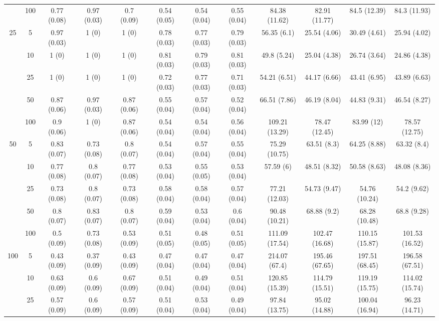 \documentclass[10pt]{article}
\theoremstyle{definition}
\begin{document}
\begin{table}[H]
\begin{center}
{\begin{tabular}{cc|ccc|ccc|cccc|}
  & 100  & 0.77 (0.08) & 0.97 (0.03) & 0.7 (0.09) & 0.54 (0.05) & 0.54 (0.04) & 0.55 (0.04) & 84.38 (11.62) & 82.91 (11.77) & 84.5 (12.39) & 84.3 (11.93) \\[.3cm] 
  \multirow{5}{*}{25} & 5  & 0.97 (0.03) & 1 (0) & 1 (0) & 0.78 (0.03) & 0.77 (0.03) & 0.79 (0.03) & 56.35 (6.1) & 25.54 (4.06) & 30.49 (4.61) & 25.94 (4.02) \\ 
   & 10  & 1 (0) & 1 (0) & 1 (0) & 0.81 (0.03) & 0.79 (0.03) & 0.81 (0.03) & 49.8 (5.24) & 25.04 (4.38) & 26.74 (3.64) & 24.86 (4.38) \\ 
  & 25  & 1 (0) & 1 (0) & 1 (0) & 0.72 (0.03) & 0.77 (0.03) & 0.71 (0.03) & 54.21 (6.51) & 44.17 (6.66) & 43.41 (6.95) & 43.89 (6.63) \\ 
  & 50  & 0.87 (0.06) & 0.97 (0.03) & 0.87 (0.06) & 0.55 (0.04) & 0.57 (0.04) & 0.52 (0.04) & 66.51 (7.86) & 46.19 (8.04) & 44.83 (9.31) & 46.54 (8.27) \\ 
  & 100  & 0.9 (0.06) & 1 (0) & 0.87 (0.06) & 0.54 (0.04) & 0.54 (0.04) & 0.56 (0.04) & 109.21 (13.29) & 78.47 (12.45) & 83.99 (12) & 78.57 (12.75)\\[.3cm] 
  \multirow{5}{*}{50} & 5  & 0.83 (0.07) & 0.73 (0.08) & 0.8 (0.07) & 0.54 (0.04) & 0.57 (0.04) & 0.55 (0.04) & 75.29 (10.75) & 63.51 (8.3) & 64.25 (8.88) & 63.32 (8.4) \\ 
  & 10  & 0.77 (0.08) & 0.8 (0.07) & 0.77 (0.08) & 0.53 (0.04) & 0.55 (0.05) & 0.53 (0.04) & 57.59 (6) & 48.51 (8.32) & 50.58 (8.63) & 48.08 (8.36) \\ 
  & 25  & 0.73 (0.08) & 0.8 (0.07) & 0.73 (0.08) & 0.58 (0.04) & 0.58 (0.04) & 0.57 (0.04) & 77.21 (12.03) & 54.73 (9.47) & 54.76 (10.24) & 54.2 (9.62) \\ 
  & 50  & 0.8 (0.07) & 0.83 (0.07) & 0.8 (0.07) & 0.59 (0.04) & 0.53 (0.04) & 0.6 (0.04) & 90.48 (10.21) & 68.88 (9.2) & 68.28 (10.48) & 68.8 (9.28) \\ 
  & 100  & 0.5 (0.09) & 0.73 (0.08) & 0.53 (0.09) & 0.51 (0.05) & 0.48 (0.05) & 0.51 (0.05) & 111.09 (17.54) & 102.47 (16.68) & 110.15 (15.87) & 101.53 (16.52) \\[.3cm] 
  \multirow{5}{*}{100} & 5  & 0.43 (0.09) & 0.37 (0.09) & 0.43 (0.09) & 0.47 (0.04) & 0.47 (0.04) & 0.47 (0.04) & 214.07 (67.4) & 195.46 (67.65) & 197.51 (68.45) & 196.58 (67.51) \\ 
  & 10  & 0.63 (0.09) & 0.6 (0.09) & 0.67 (0.09) & 0.51 (0.04) & 0.49 (0.04) & 0.51 (0.04) & 120.85 (15.39) & 114.79 (15.51) & 119.19 (15.75) & 114.02 (15.74) \\ 
  & 25  & 0.57 (0.09) & 0.6 (0.09) & 0.57 (0.09) & 0.51 (0.04) & 0.53 (0.04) & 0.49 (0.04) & 97.84 (13.75) & 95.02 (14.88) & 100.04 (16.94) & 96.23 (14.71) \\ 

\end{tabular}}
\end{center}
\end{table}
\end{document}
